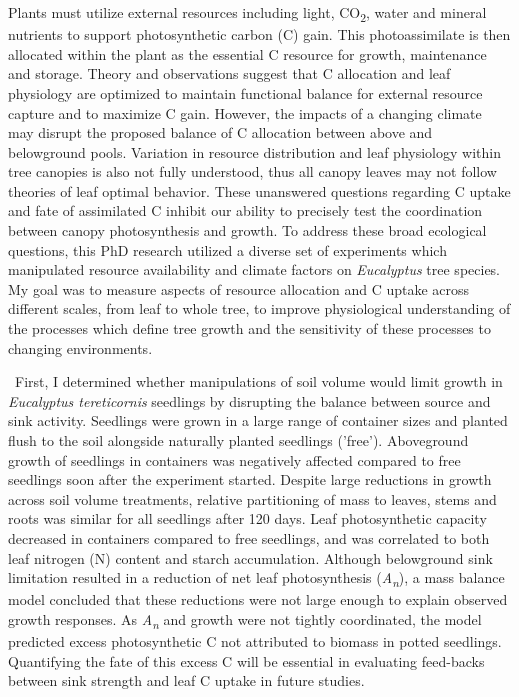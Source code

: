 \documentclass[a4paper]{article}
\begin{document}
Plants must utilize external resources including light, CO\textsubscript{2}, water and mineral nutrients to support photosynthetic carbon (C) gain.  This photoassimilate is then allocated within the plant as the essential C resource for growth, maintenance and storage. Theory and observations suggest that C allocation and leaf physiology are optimized to maintain functional balance for external resource capture and to maximize C gain. However, the impacts of a changing climate may disrupt the proposed balance of C allocation between above and belowground pools. Variation in resource distribution and leaf physiology within tree canopies is also not fully understood, thus all canopy leaves may not follow theories of leaf optimal behavior. These unanswered questions regarding C uptake and fate of assimilated C inhibit our ability to precisely test the coordination between canopy photosynthesis and growth. To address these broad ecological questions, this PhD research utilized a diverse set of experiments which manipulated resource availability and climate factors on \textit{Eucalyptus} tree species. My goal was to measure aspects of resource allocation and C uptake across different scales, from leaf to whole tree, to improve physiological understanding of the processes which define tree growth and the sensitivity of these processes to changing environments.

\
First, I determined whether manipulations of soil volume would limit growth in \textit{Eucalyptus tereticornis} seedlings by disrupting the balance between source and sink activity. Seedlings were grown in a large range of container sizes and planted flush to the soil alongside naturally planted seedlings ('free'). Aboveground growth of seedlings in containers was negatively affected compared to free seedlings soon after the experiment started. Despite large reductions in growth across soil volume treatments, relative partitioning of mass to leaves, stems and roots was similar for all seedlings after 120 days. Leaf photosynthetic capacity decreased in containers compared to free seedlings, and was correlated to both leaf nitrogen (N) content and starch accumulation. Although belowground sink limitation resulted in a reduction of net leaf photosynthesis (\textit{A\textsubscript{n}}), a mass balance model concluded that these reductions were not large enough to explain observed growth responses. As \textit{A\textsubscript{n}} and growth were not tightly coordinated, the model predicted excess photosynthetic C not attributed to biomass in potted seedlings. Quantifying the fate of this excess C will be essential in evaluating feed-backs between sink strength and leaf C uptake in future studies.
\end{document}
